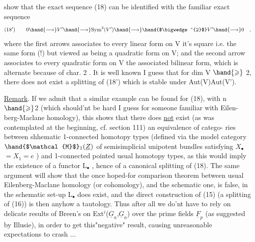
show that the exact sequence (18) can be identified with the familiar
exact sequence
\[ (18') \qquad 0 \hand{\longrightarrow} V' \hand{\longrightarrow} \mathrm{Sym}^2(V') \hand{\longrightarrow} \hand{$\bigwedge^{2}$} V' \hand{\longrightarrow} 0 \quad , \]
where the first arrows associates to every linear form on V it's square
i.e. the same form (!) but viewed as being a quadratic form on V; and
the second arrow associates to every quadratic form on V the associated
bilinear form, which is alternate because of char. 2 . It is well
known I guess that for dim V $\hand{\geqslant}$ 2, there does not exist a splitting of
(18') which is stable under Aut(V)\hand{$\simeq$}Aut(V').

\uline{Remark}. If we admit that a similar example can be found for  (18), with
n $\hand{\geqslant}$2 (which should'nt be hard I guess for someone familiar with Eilen-%
berg-Maclane homology), this shows that there does \uline{not} exist (as was
contemplated at the beginning, cf. section 111) an equivalence of catego-%
ries between shhematic 1-connected homotopy types (defined via the
model category $\hand{$\mathcal{M}$}_1(\underline{Z})$ of semisimplicial unipotent bundles  satisfying
$X_{\bullet}$$=X_1=e$ ) and 1-connected pointed usual homotopy types, as this would
imply the existence of a functor L\hand{$\Pi$}$_{\bullet}$ , \xout{\unsure{(**)}} hence of a canonical splitting
of (18). The same argument will show that the once hoped-for comparison
theorem between usual Eilenberg-Maclane homology (or cohomology), and
the schematic one, is false,   in the schematic set-up L\hand{$\Pi$}$_{\bullet}$ does
exist, and the direct construction of (15) (a  splitting of (16)) is
then anyhow a tautology. Thus after all we do'nt have to rely on
delicate results of Breen's on  Ext$^{i}$($\underline{G}_a$,$\underline{G}_a$) over the
prime fields $\underline{F}_p$  (as suggested by Illusie), in order
to get this"negative" result, causing unreasonable expectations to
crash ...


